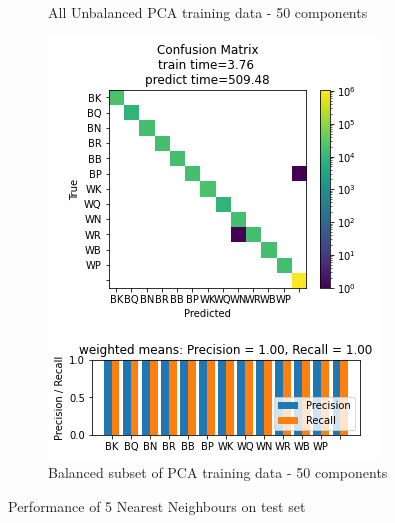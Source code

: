 \documentclass{article}
\newcommand{\FIGLABEL}[1]{Performance of #1 on test set}
\newcommand{\PCAFL}{All Unbalanced PCA training data - 50 components}
\newcommand{\PCABL}{Balanced subset of PCA training data - 50 components}
\begin{document}
\begin{figure}[h]
\begin{subfigure}{0.33\textwidth}
\caption{\PCAFL}
\end{subfigure}
\begin{subfigure}{0.33\textwidth}
\includegraphics[width=0.9\linewidth]{5NN_B_PCA50c_160x160_evaluation.png} 
\caption{\PCABL}
\end{subfigure}
\caption{\FIGLABEL{5 Nearest Neighbours}}
\label{fig:5NN}
\end{figure}
\end{document}
